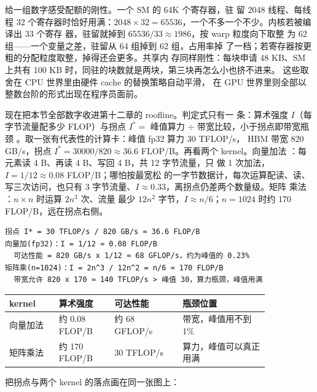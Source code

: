 给一组数字感受配额的刚性。一个 SM 的 64K 个寄存器，驻
留 2048 线程、每线程 32 个寄存器时恰好用满：$2048\times
32=65536$，一个不多一个不少。内核若被编译出 33 个寄存
器，驻留就掉到 $65536/33\approx1986$，按 warp 粒度向下取整
为 62 组——一个变量之差，驻留从 64 组掉到 62 组，占用率掉
了一档；若寄存器按更粗的分配粒度取整，掉得还会更多。共享内
存同样刚性：每块申请 48 KB、SM 上共有 100
KB 时，同驻的块数就是两块，第三块再怎么小也挤不进来。
这些取舍在 CPU 世界里由硬件 cache 的替换策略自动平滑，
在 GPU 世界里则全部以整数台阶的形式出现在程序员面前。

现在把本节全部数字收进第十二章的 roofline。判定式只有一
条：算术强度 $I$（每字节流量配多少 FLOP）与拐点
$I^{*}=$ 峰值算力 $\div$ 带宽比较，小于拐点即带宽瓶颈
。取一张有代表性的计算卡：峰值 fp32 算力 30 TFLOP/s，
HBM 带宽 820 GB/s，拐点 $I^{*}=30000/820\approx36.6$
FLOP/B。再看两个 kernel。向量加法 
：每元素读 4 B、再读 4 B、写回 4 B，共 12 字节流量，只
做 1 次加法，$I=1/12\approx0.08$ FLOP/B；哪怕按最宽松
的一字节数据计，每次运算配读、读、写三次访问，也只有
3 字节流量、$I\approx0.33$，离拐点仍差两个数量级。矩阵
乘法 ：$n\times n$ 时运算 $2n^{3}$ 次、流量
最少 $12n^{2}$ 字节，$I\approx n/6$；$n=1024$ 时约
170 FLOP/B，远在拐点右侧。

\begin{lstlisting}
拐点 I* = 30 TFLOP/s / 820 GB/s ≈ 36.6 FLOP/B
向量加(fp32)：I = 1/12 ≈ 0.08 FLOP/B
  可达性能 = 820 GB/s x 1/12 ≈ 68 GFLOP/s，约为峰值的 0.23%
矩阵乘(n=1024)：I = 2n^3 / 12n^2 = n/6 ≈ 170 FLOP/B
  带宽允许 820 x 170 ≈ 140 TFLOP/s > 峰值 30，算力瓶颈，峰值用满
\end{lstlisting}

\begin{longtable}{L{0.16\linewidth}L{0.18\linewidth}L{0.22\linewidth}L{0.28\linewidth}}
\toprule
kernel & 算术强度 & 可达性能 & 瓶颈位置 \\
\midrule
向量加法 & 约 0.08 FLOP/B & 约 68 GFLOP/s & 带宽，峰值用不到 1\% \\
矩阵乘法 & 约 170 FLOP/B & 30 TFLOP/s & 算力，峰值可以真正用满 \\
\bottomrule
\end{longtable}

把拐点与两个 kernel 的落点画在同一张图上：

